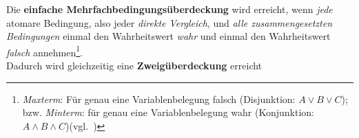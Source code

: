 \begin{tcolorbox}[title=Einfache Mehrfachbedingungsüberdeckung]
    Die \textbf{einfache Mehrfachbedingungsüberdeckung} wird erreicht, wenn \textit{jede} atomare Bedingung, also jeder \textit{direkte Vergleich}, und \textit{alle zusammengesetzten Bedingungen} einmal den Wahrheitswert \textit{wahr} und einmal den Wahrheitswert \textit{falsch} annehmen\footnote{
        \textit{Maxterm}: Für genau eine Variablenbelegung falsch (Disjunktion: $A \lor B \lor C$); bzw. \textit{Minterm}: für genau eine Variablenbelegung wahr (Konjunktion: $A \land B \land C$)(vgl.~\cite[92]{Hof22})
    }.\\
    Dadurch wird gleichzeitig eine \textbf{Zweigüberdeckung} erreicht
\end{tcolorbox}